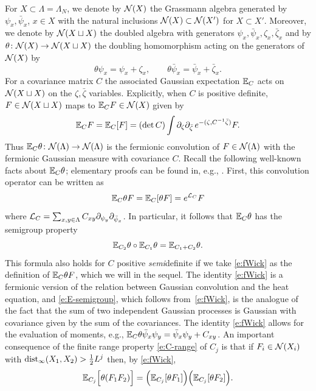 \documentclass[11pt]{amsart}
\numberwithin{equation}{section}
\numberwithin{theorem}{section}
\newcommand{\1}{{\bf 1}}
\begin{document}
For $X \subset \Lambda=\Lambda_N$, we denote by $\mathcal N(X)$ the Grassmann algebra generated by $\psi_x,\bar\psi_x$, $x\in X$
with the natural inclusions $\mathcal N(X) \subset \mathcal N(X')$ for $X \subset X'$.
Moreover, we denote by $\mathcal N(X \sqcup X)$ the doubled algebra with generators $\psi_x,\bar\psi_x,\zeta_x,\bar\zeta_x$
and by $\theta\colon \mathcal N(X) \to \mathcal N(X \sqcup X)$ the doubling homomorphism acting on the generators of $\mathcal N(X)$ by
\begin{equation}\label{e:theta-def}
  \theta \psi_x = \psi_x+\zeta_x, \qquad \theta \bar\psi_x = \bar\psi_x + \bar\zeta_x.
\end{equation}
For a covariance matrix $C$ the associated Gaussian expectation
$\mathbb{E}_{C}$ acts on $\mathcal N(X\sqcup X)$ on the $\zeta,\bar\zeta$
variables. Explicitly, when $C$ is positive definite, $F\in
\mathcal N(X\sqcup X)$ maps to $\mathbb{E}_{C}F \in \mathcal N(X)$ given by 
\begin{equation}
  \mathbb{E}_CF
  = \mathbb{E}_C[F]
  = (\det C)\int \partial_{\zeta}\partial_{\bar\zeta}\, e^{-(\zeta,C^{-1}\bar\zeta)} F.
\end{equation}
Thus $\mathbb{E}_{C}\theta \colon \mathcal N(\Lambda) \to \mathcal N(\Lambda)$ is the
fermionic convolution of $F \in \mathcal N(\Lambda)$ with the fermionic
Gaussian measure with covariance $C$. Recall the following
well-known facts about $\mathbb{E}_{C}\theta$; elementary proofs can be
found in, e.g., \cite{MR3332938}. First, this convolution operator
can be written as
\begin{equation}
  \label{e:fWick}
  \mathbb{E}_{C}\theta F
  = \mathbb{E}_C[\theta F]
  = e^{\mathcal L_{C}}F
\end{equation}
where  $\mathcal L_C = \sum_{x,y\in\Lambda} C_{xy} \partial_{\psi_y} \partial_{\bar\psi_x}$.
In particular, it follows that $\mathbb{E}_{C}\theta$ has the semigroup property
\begin{equation} \label{e:E-semigroup}
  \mathbb{E}_{C_2}\theta \circ \mathbb{E}_{C_1}\theta = \mathbb{E}_{C_1+C_2}\theta.
\end{equation}
This formula also holds for $C$ positive \emph{semi}definite if we
take \eqref{e:fWick} as the definition of $\mathbb{E}_{C}\theta F$, which we
will in the sequel.  The identity \eqref{e:fWick} is a
fermionic version of the relation between Gaussian convolution and
the heat equation, and \eqref{e:E-semigroup}, which follows
from~\eqref{e:fWick}, is the analogue of the fact that the sum of
two independent Gaussian processes is Gaussian with covariance given
by the sum of the covariances. The identity \eqref{e:fWick} allows
for the evaluation of moments, e.g.,
$\mathbb{E}_{C}\theta \bar\psi_{x}\psi_{y}=\bar\psi_x\psi_y+C_{xy}$. An
important consequence of the finite range property \eqref{e:C-range}
of $C_j$ is that if $F_i \in \mathcal N(X_i)$ with
$\operatorname{dist}_{\infty}(X_1,X_2)> \frac12 L^j$ then, by \eqref{e:fWick},
\begin{equation}
  \mathbb{E}_{C_j}{\Bigl[{\theta ({F_1F_2})}\Bigr]} = \Bigl({\mathbb{E}_{C_j}[\theta F_1]}\Bigr)\Bigl({\mathbb{E}_{C_j}[\theta F_2]}\Bigr).
\end{equation}
\end{document}
